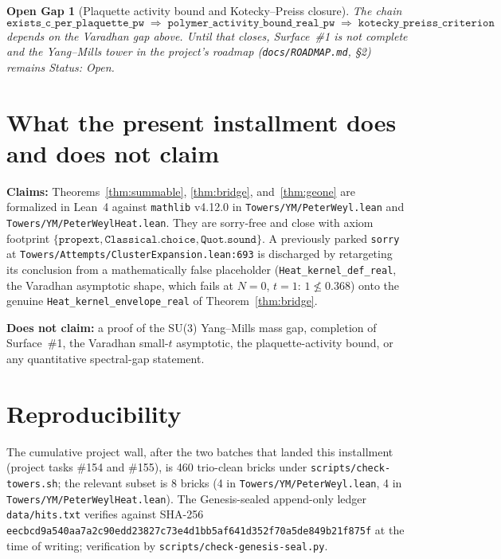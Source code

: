 \documentclass{article}
\newtheorem*{opengap}{Open Gap}
\begin{document}
\begin{opengap}[Plaquette activity bound and Kotecky--Preiss closure]
The chain
\[
  \texttt{exists\_c\_per\_plaquette\_pw}
  \;\Rightarrow\;
  \texttt{polymer\_activity\_bound\_real\_pw}
  \;\Rightarrow\;
  \texttt{kotecky\_preiss\_criterion}
\]
depends on the Varadhan gap above. Until that closes, Surface~\#1
is not complete and the Yang--Mills tower in the project's roadmap
(\texttt{docs/ROADMAP.md}, \S 2) remains \emph{Status: Open}.
\end{opengap}

\section{What the present installment does and does not claim}

\noindent\textbf{Claims:}
Theorems~\ref{thm:summable}, \ref{thm:bridge}, and~\ref{thm:geone}
are formalized in Lean~4 against \texttt{mathlib} v4.12.0 in
\texttt{Towers/YM/PeterWeyl.lean} and
\texttt{Towers/YM/PeterWeylHeat.lean}. They are sorry-free and close
with axiom footprint $\{\texttt{propext}, \texttt{Classical.choice},
\texttt{Quot.sound}\}$. A previously parked
\texttt{sorry} at \texttt{Towers/Attempts/ClusterExpansion.lean:693}
is discharged by retargeting its conclusion from a
mathematically false placeholder
(\texttt{Heat\_kernel\_def\_real}, the Varadhan asymptotic shape,
which fails at $N=0$, $t=1$: $1 \not\le 0.368$) onto the genuine
\texttt{Heat\_kernel\_envelope\_real} of Theorem~\ref{thm:bridge}.

\noindent\textbf{Does not claim:} a proof of the SU(3) Yang--Mills
mass gap, completion of Surface~\#1, the Varadhan small-$t$
asymptotic, the plaquette-activity bound, or any quantitative
spectral-gap statement.

\section*{Reproducibility}

The cumulative project wall, after the two batches that landed this
installment (project tasks \#154 and \#155), is 460 trio-clean
bricks under \texttt{scripts/check-towers.sh}; the relevant subset
is 8 bricks (4 in \texttt{Towers/YM/PeterWeyl.lean}, 4 in
\texttt{Towers/YM/PeterWeylHeat.lean}). The Genesis-sealed
append-only ledger \texttt{data/hits.txt} verifies against SHA-256
\texttt{eecbcd9a540aa7a2c90edd23827c73e4d1bb5af641d352f70a5de849b21f875f}
at the time of writing; verification by
\texttt{scripts/check-genesis-seal.py}.
\end{document}
